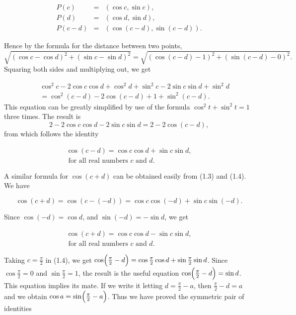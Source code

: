 \begin{eqnarray*}
P(c) &=& (\cos c, \sin c),\\
P(d) &=& (\cos d, \sin d),\\
P(c-d) &=& (\cos (c-d), \sin (c-d)).
\end{eqnarray*}

\noindent Hence by the formula for the distance between two points, 
$$
\sqrt{(\cos c - \cos d)^2 + (\sin c - \sin d)^2}
= \sqrt{(\cos (c - d) - 1)^2 + (\sin (c - d) - 0)^2}.
$$
\noindent Squaring both sides and multiplying out, we get 

\begin{eqnarray*}
&&\cos^{2}c - 2 \cos c \cos d + \cos^{2}d + \sin^{2}c - 2 \sin c \sin d + \sin^{2}d\\
&&= \cos^{2}(c - d) - 2 \cos(c - d) + 1 + \sin^{2}(c - d).
\end{eqnarray*}
\noindent This equation can be greatly simplified by use of the formula $\cos^{2}t + \sin^{2}t = 1$ three times.  The result is
$$
2 - 2 \cos c \cos d - 2 \sin c \sin d = 2 - 2 \cos(c - d), 
$$
\noindent from which follows the identity

\begin{theorem} %
$$
\begin{array}{c}
\cos(c - d) = \cos c \cos d + \sin c \sin d, \\
\; \mbox{for all real numbers $c$ and $d$.} 
\end{array}
$$
\end{theorem}

A similar formula for $\cos(c + d)$ can be obtained easily from (1.3) and (1.4). We have 

$$
\cos(c + d) = \cos(c - (-d)) = \cos c \cos(-d) + \sin c \sin(-d).  
$$

\noindent Since $\cos(-d) = \cos d$, and $\sin(-d) = -\sin d$, we get

\begin{theorem} %
$$
\begin{array}{c}
\cos(c + d) = \cos c \cos d - \sin c \sin d, \\ 
\;\mbox{for all real numbers $c$ and $d$.} 
\end{array}
$$
\end{theorem}

Taking $c = \frac{\pi}{2}$ in (1.4), we get $ \cos \Bigl(\frac{\pi}{2} - d \Bigr) = \cos \frac{\pi}{2} \cos d + \sin \frac{\pi}{2} \sin d$. Since $\cos \frac{\pi}{2} = 0$ and $\sin \frac{\pi}{2} = 1$, the result is the useful equation $\cos \Bigl(\frac{\pi}{2} - d \Bigr) = \sin d$. This equation implies its mate. If we write it letting $d = \frac{\pi}{2} - a$, then $\frac{\pi}{2} - d = a$ and we obtain $\cos a = \sin \Bigl(\frac{\pi}{2} - a\Bigr)$. Thus we have proved the symmetric pair of identities 

